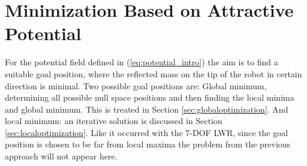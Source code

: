 %
%
%














\section{Minimization Based on Attractive Potential}
\label{sec:Minimattractivepotential}




For the potential field  defined in (\ref{eq:potential_intro}) the aim is to find a suitable goal position, where the reflected mass on the tip of the robot in certain direction is minimal. Two possible goal positions are: Global minimum, determining all possible null space positions and then finding the local minima and global minimum. This is treated in  Section \ref{sec:globaloptimization}. And local minimum: an iterative solution is discussed in  Section \ref{sec:localoptimization}.
Like it occurred with the 7-DOF LWR, since the goal position is chosen to be far from local maxima the problem from the previous approach will not appear here.


